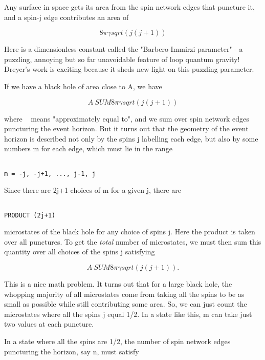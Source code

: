 Any surface in space gets its area from the spin network edges that
puncture it, and a spin-j edge contributes an area of


$$

8 \pi  \gamma  sqrt(j(j+1))
$$
    
Here \gamma  is a dimensionless constant called the "Barbero-Immirzi
parameter" - a puzzling, annoying but so far unavoidable feature of 
loop quantum gravity!  Dreyer's work is exciting because it sheds new
light on this puzzling parameter.

If we have a black hole of area close to A, we have


$$

A ~ SUM 8 \pi  \gamma  sqrt(j(j+1))
$$
    
where ~ means "approximately equal to", and we sum over spin network
edges puncturing the event horizon.  But it turns out that the geometry
of the event horizon is described not only by the spins j labelling each
edge, but also by some numbers m for each edge, which must lie in the
range


\begin{verbatim}

m = -j, -j+1, ..., j-1, j
\end{verbatim}
    
Since there are 2j+1 choices of m for a given j, there are 


\begin{verbatim}

PRODUCT (2j+1)
\end{verbatim}
    
microstates of the black hole for any choice of spins j.  Here the
product is taken over all punctures.  To get the \emph{total} number of
microstates, we must then sum this quantity over all choices of 
the spins j satisfying 


$$

A ~ SUM 8 \pi  \gamma  sqrt(j(j+1)).
$$
    
This is a nice math problem.  It turns out that for a large black hole,
the whopping majority of all microstates come from taking all the spins
to be as small as possible while still contributing some area.  So, we
can just count the microstates where all the spins j equal 1/2.  In a
state like this, m can take just two values at each puncture.

In a state where all the spins are 1/2, the number of spin network edges
puncturing the horizon, say n, must satisfy


